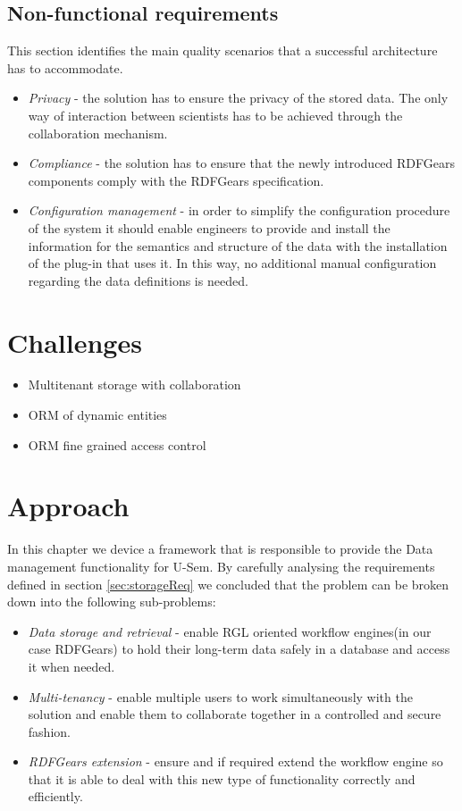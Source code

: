 \subsection{Non-functional requirements}
This section identifies the main quality scenarios that a successful architecture has to accommodate.

\begin{itemize}
	\item \textit{Privacy} - the solution has to ensure the privacy of the stored data. The only way of interaction between scientists has to be achieved through the collaboration mechanism.
	
	\item \textit{Compliance} - the solution has to ensure that the newly introduced RDFGears components comply with the RDFGears specification. 
	
	\item \textit{Configuration management} - in order to simplify the configuration procedure of the system it should enable engineers to provide and install the information for the semantics and structure of the data with the installation of the plug-in that uses it. In this way, no additional manual configuration regarding the data definitions is needed.
	
\end{itemize}

\section{Challenges}

\begin{itemize}
	\item Multitenant storage with collaboration
	\item ORM of dynamic entities
	\item ORM fine grained access control
\end{itemize}

\section{Approach}
In this chapter we device a framework that is responsible to provide the Data management functionality for U-Sem. By carefully analysing the requirements defined in section \ref{sec:storageReq} we concluded that the problem can be broken down into the following sub-problems:
\begin{itemize}
	\item \textit{Data storage and retrieval} - enable RGL oriented workflow engines(in our case RDFGears) to hold their long-term data safely in a database and access it when needed.
	\item \textit{Multi-tenancy} - enable multiple users to work simultaneously with the solution and enable them to collaborate together in a controlled and secure fashion.
	\item \textit{RDFGears extension} - ensure and if required extend the workflow engine so that it is able to deal with this new type of functionality correctly and efficiently.
\end{itemize}

